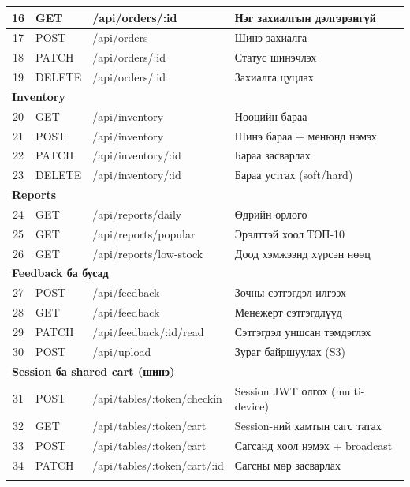 \begin{longtable}{|c|l|p{4cm}|p{5.5cm}|}
16 & GET  & /api/orders/:id & Нэг захиалгын дэлгэрэнгүй \\ \hline
\rowcolor{LightBlue}
17 & POST & /api/orders & Шинэ захиалга \\ \hline
18 & PATCH & /api/orders/:id & Статус шинэчлэх \\ \hline
\rowcolor{LightBlue}
19 & DELETE & /api/orders/:id & Захиалга цуцлах \\ \hline
\multicolumn{4}{|l|}{\textbf{Inventory}} \\ \hline
20 & GET  & /api/inventory & Нөөцийн бараа \\ \hline
\rowcolor{LightBlue}
21 & POST & /api/inventory & Шинэ бараа + менюнд нэмэх \\ \hline
22 & PATCH & /api/inventory/:id & Бараа засварлах \\ \hline
\rowcolor{LightBlue}
23 & DELETE & /api/inventory/:id & Бараа устгах (soft/hard) \\ \hline
\multicolumn{4}{|l|}{\textbf{Reports}} \\ \hline
24 & GET  & /api/reports/daily & Өдрийн орлого \\ \hline
\rowcolor{LightBlue}
25 & GET  & /api/reports/popular & Эрэлттэй хоол ТОП-10 \\ \hline
26 & GET  & /api/reports/low-stock & Доод хэмжээнд хүрсэн нөөц \\ \hline
\multicolumn{4}{|l|}{\textbf{Feedback ба бусад}} \\ \hline
\rowcolor{LightBlue}
27 & POST & /api/feedback & Зочны сэтгэгдэл илгээх \\ \hline
28 & GET  & /api/feedback & Менежерт сэтгэгдлүүд \\ \hline
\rowcolor{LightBlue}
29 & PATCH & /api/feedback/:id/read & Сэтгэгдэл уншсан тэмдэглэх \\ \hline
30 & POST & /api/upload & Зураг байршуулах (S3) \\ \hline
\multicolumn{4}{|l|}{\textbf{Session ба shared cart (шинэ)}} \\ \hline
\rowcolor{LightBlue}
31 & POST & /api/tables/:token/checkin & Session JWT олгох (multi-device) \\ \hline
32 & GET & /api/tables/:token/cart & Session-ний хамтын сагс татах \\ \hline
\rowcolor{LightBlue}
33 & POST & /api/tables/:token/cart & Сагсанд хоол нэмэх + broadcast \\ \hline
34 & PATCH & /api/tables/:token/cart/:id & Сагсны мөр засварлах \\ \hline
\rowcolor{LightBlue}

\end{longtable}
